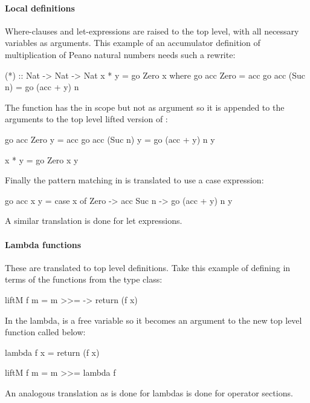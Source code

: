 \paragraph{Local definitions} Where-clauses and let-expressions are
raised to the top level, with all necessary variables as
arguments. This example of an accumulator definition of multiplication
of Peano natural numbers needs such a rewrite:

\begin{code}
(*) :: Nat -> Nat -> Nat
x * y = go Zero x where go acc Zero    = acc
                        go acc (Suc n) = go (acc + y) n
\end{code}

\noindent
The  function has the  in scope but not as argument so it
is appended to the arguments to the top level lifted version of :

\begin{code}
go acc Zero    y = acc
go acc (Suc n) y = go (acc + y) n y

x * y = go Zero x y
\end{code}

\noindent
Finally the pattern matching in  is translated to use a case expression:

\begin{code}
go acc x y = case x of
     Zero  -> acc
     Suc n -> go (acc + y) n y
\end{code}

A similar translation is done for let expressions.

\paragraph{Lambda functions} These are translated to top level
definitions. Take this example of defining  in terms of the
functions from the  type class:

\begin{code}
liftM f m = m >>= \x -> return (f x)
\end{code}

\noindent
In the lambda,  is a free variable so it becomes an argument to
the new top level function called  below:

\begin{code}
lambda f x = return (f x)

liftM f m = m >>= lambda f
\end{code}

An analogous translation as is done for lambdas is done for operator sections.

